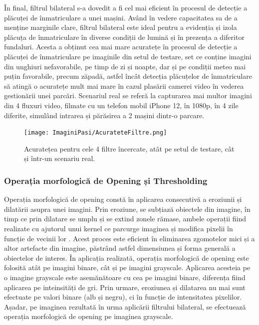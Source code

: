 \documentclass[12pt]{article}
\begin{document}
\^{I}n final, filtrul bilateral s-a dovedit a fi cel mai eficient \^{i}n procesul de detecție a pl\u{a}cuței de \^{i}nmatriculare a unei mașini. Av\^{a}nd \^{i}n vedere capacitatea sa de a menține marginile clare, filtrul bilateral este ideal pentru a evidenția și izola pl\u{a}cuța de \^{i}nmatriculare \^{i}n diverse condiții de lumin\u{a} și \^{i}n prezența a diferitor fundaluri. Acesta a obținut cea mai mare acuratețe \^{i}n procesul de detecție a pl\u{a}cuței de \^{i}nmatriculare pe imaginile din setul de testare, set ce conține imagini din unghiuri nefavorabile, pe timp de zi și noapte, dar și pe condiții meteo mai puțin favorabile, precum z\u{a}pad\u{a}, astfel \^{i}nc\^{a}t detecția pl\u{a}cuțelor de \^{i}nmatriculare s\u{a} ating\u{a} o acuratețe mult mai mare \^{i}n cazul plas\u{a}rii camerei video \^{i}n vederea gestion\u{a}rii unei parc\u{a}ri. Scenariul real se refer\u{a} la capturarea mai multor imagini din 4 fluxuri video, filmate cu un telefon mobil iPhone 12, \^{i}n 1080p, \^{i}n 4 zile diferite, simul\^{a}nd intrarea și p\u{a}r\u{a}sirea a 2 mașini dintr-o parcare.

\begin{figure}[H]
  \centering
  \texttt{[image: ImaginiPasi/AcurateteFiltre.png]}
  \caption{Acuratețea pentru cele 4 filtre \^{i}ncercate, at\^{a}t pe setul de testare, c\^{a}t și \^{i}ntr-un scenariu real.}
  \label{fig:comparatie_filtre}
\end{figure}

\subsubsection{Operația morfologic\u{a} de Opening și Thresholding}
Operația morfologic\u{a} de opening const\u{a} \^{i}n aplicarea consecutiv\u{a} a eroziunii și dilat\u{a}rii asupra unei imagini. Prin eroziune, se subțiaz\u{a} obiectele din imagine, \^{i}n timp ce prin dilatare se umplu și se extind zonele r\u{a}mase, ambele operații fiind realizate cu ajutorul unui kernel ce parcurge imaginea și modifica pixelii \^{i}n funcție de vecinii lor \cite{grayscaleopening}. Acest proces este eficient \^{i}n eliminarea zgomotelor mici și a altor artefacte din imagine, p\u{a}str\^{a}nd astfel dimensiunea și forma general\u{a} a obiectelor de interes. \^{I}n aplicația realizat\u{a}, operația morfologic\u{a} de opening este folosit\u{a} at\^{a}t pe imagini binare, c\^{a}t și pe imagini grayscale. Aplicarea acesteia pe o imagine grayscale este asem\u{a}n\u{a}toare cu cea pe imagini binare, diferența fiind aplicarea pe inteinsit\u{a}ți de gri. Prin urmare, eroziunea și dilatarea nu mai sunt efectuate pe valori binare (alb și negru), ci \^{i}n funcție de intensitatea pixelilor. Așadar, pe imaginea rezultat\u{a} \^{i}n urma aplic\u{a}rii filtrului bilateral, se efectueaz\u{a} operația morfologic\u{a} de opening pe imaginea grayscale.
\end{document}

